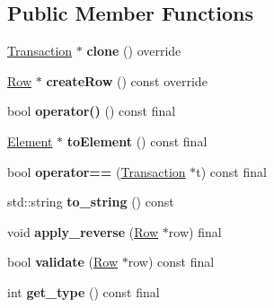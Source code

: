 \subsection*{Public Member Functions}
\begin{DoxyCompactItemize}
\item 
\mbox{\label{classRewardTransaction_a414728d857fcf05295a7f3f4fa024dc1}} 
\mbox{\hyperlink{classTransaction}{Transaction}} $\ast$ {\bfseries clone} () override
\item 
\mbox{\label{classRewardTransaction_ad43c1d706406f40d43f433b0d0b0b510}} 
\mbox{\hyperlink{classRow}{Row}} $\ast$ {\bfseries create\+Row} () const override
\item 
\mbox{\label{classReward_a1d04370c094170b0d166c341daa1644e}} 
bool {\bfseries operator()} () const final
\item 
\mbox{\label{classReward_a0ecd536148463880f9980fe415b6eb1d}} 
\mbox{\hyperlink{classElement}{Element}} $\ast$ {\bfseries to\+Element} () const final
\item 
\mbox{\label{classReward_ab2cd65f16c670e3e9d8cfe84a6dc56cb}} 
bool {\bfseries operator==} (\mbox{\hyperlink{classTransaction}{Transaction}} $\ast$t) const final
\item 
\mbox{\label{classReward_a0d65cd39eb260091d1f2cf19e2e71de7}} 
std\+::string {\bfseries to\+\_\+string} () const
\item 
\mbox{\label{classReward_a494c9d6e0a220729f675fd6131cfb9af}} 
void {\bfseries apply\+\_\+reverse} (\mbox{\hyperlink{classRow}{Row}} $\ast$row) final
\item 
\mbox{\label{classReward_a9c9a3219ba6b8b068f7f1cccc779b1b5}} 
bool {\bfseries validate} (\mbox{\hyperlink{classRow}{Row}} $\ast$row) const final
\item 
\mbox{\label{classReward_a1d3d05263d54771a314927d09585968c}} 
int {\bfseries get\+\_\+type} () const final
\item 
\mbox{\label{classReward_a95e98fc9dbbc9da47cee243adc1932d2}} 

\end{DoxyCompactItemize}
